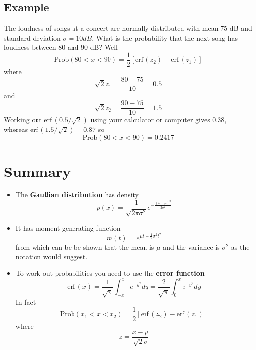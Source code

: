 \documentclass[11pt,a4paper]{scrartcl}
\begin{document}
\subsection*{Example}

The loudness of songs at a concert are normally distributed with mean 75 dB and standard deviation $\sigma=10 dB$. What is the probability that the next song has loudness between 80 and 90 dB? Well
\begin{equation}
\mbox{Prob}(80<x<90)=\frac{1}{2}[\mbox{erf}\,(z_2)-\mbox{erf}\,(z_1)]
\end{equation}
where 
\begin{equation}
\sqrt{2}z_1=\frac{80-75}{10}=0.5
\end{equation}
and 
\begin{equation}
\sqrt{2}z_2=\frac{90-75}{10}=1.5
\end{equation}
Working out $\mbox{erf}\,(0.5/\sqrt{2})$ using your calculator or computer gives 0.38, whereas $\mbox{erf}\,(1.5/\sqrt{2})=0.87$ so
\begin{equation}
\mbox{Prob}(80<x<90)=0.2417
\end{equation}

\newpage

\section*{Summary}

\begin{itemize}

\item The \textbf{Gau\ss{}ian distribution} has density
  \begin{equation}
p(x)=\frac{1}{\sqrt{2\pi\sigma^2}}e^{-\frac{(x-\mu)^2}{2\sigma^2}}
  \end{equation}

\item It has moment generating function
  \begin{equation}
m(t)= e^{\mu t + \frac{1}{2}\sigma^2 t^2}
  \end{equation}
  from which can be be shown that the mean is $\mu$ and the variance is $\sigma^2$ as the notation would suggest.

\item To work out probabilities you need to use the \textbf{error function}
  \begin{equation}
\mbox{erf}\,(x)=\frac{1}{\sqrt{\pi}}\int_{-x}^xe^{-y^2}dy=\frac{2}{\sqrt{\pi}}\int_0^xe^{-y^2}dy
  \end{equation}
  In fact
  \begin{equation}
\mbox{Prob}(x_1<x<x_2)=\frac{1}{2}[\mbox{erf}\,(z_2)-\mbox{erf}\,(z_1)]
  \end{equation}
  where
  \begin{equation}
z=\frac{x-\mu}{\sqrt{2}\sigma}
  \end{equation}
  \end{itemize}
\end{document}
